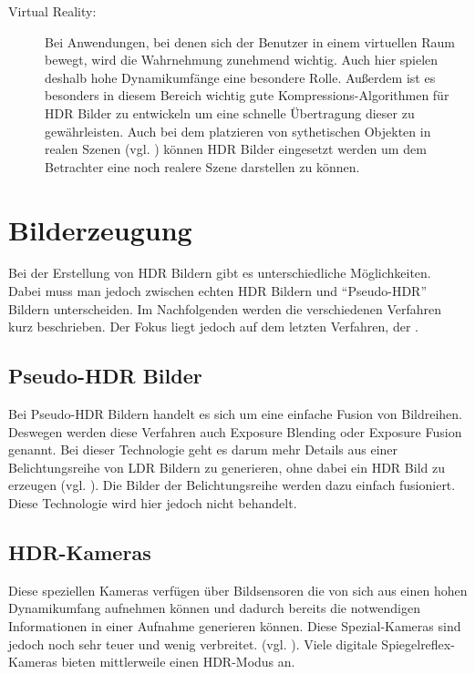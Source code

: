 \begin{description}
\item[Virtual Reality:] Bei Anwendungen, bei denen sich der Benutzer in einem virtuellen Raum bewegt, wird die Wahrnehmung zunehmend wichtig. Auch hier spielen deshalb hohe Dynamikumfänge eine besondere Rolle. Außerdem ist es besonders in diesem Bereich wichtig gute Kompressions-Algorithmen für \gls{HDR} Bilder zu entwickeln um eine schnelle Übertragung dieser zu gewährleisten. Auch bei dem platzieren von sythetischen Objekten in realen Szenen (vgl. \cite{Debevec:2008:RSO:1401132.1401175}) können \gls{HDR} Bilder eingesetzt werden um dem Betrachter eine noch realere Szene darstellen zu können.
\end{description}

\section{Bilderzeugung}
Bei der Erstellung von \gls{HDR} Bildern gibt es unterschiedliche Möglichkeiten. Dabei muss man jedoch zwischen echten \gls{HDR} Bildern und \enquote{Pseudo-\gls{HDR}} Bildern unterscheiden. Im Nachfolgenden werden die verschiedenen Verfahren kurz beschrieben. Der Fokus liegt jedoch auf dem letzten Verfahren, der .

\subsection{Pseudo-HDR Bilder}
Bei Pseudo-\gls{HDR} Bildern handelt es sich um eine einfache Fusion von Bildreihen. Deswegen werden diese Verfahren auch Exposure Blending oder Exposure Fusion genannt. Bei dieser Technologie geht es darum mehr Details aus einer Belichtungsreihe von \gls{LDR} Bildern zu generieren, ohne dabei ein \gls{HDR} Bild zu erzeugen (vgl. \cite{Jing_Hong_Zheng_Rahardja_2012}). Die Bilder der Belichtungsreihe werden dazu einfach fusioniert. Diese Technologie wird hier jedoch nicht behandelt.

\subsection{HDR-Kameras} 
Diese speziellen Kameras verfügen über Bildsensoren die von sich aus einen hohen Dynamikumfang aufnehmen können und dadurch bereits die notwendigen Informationen in einer Aufnahme generieren können. Diese Spezial-Kameras sind jedoch noch sehr teuer und wenig verbreitet. (vgl. \cite[S. 96]{Bloch2012}). Viele digitale Spiegelreflex-Kameras bieten mittlerweile einen \gls{HDR}-Modus an.

